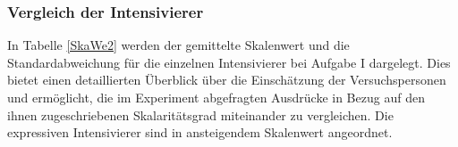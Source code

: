 \subsubsection{Vergleich der Intensivierer} \label{abs:I-Vergleich339}


In Tabelle \ref{SkaWe2} werden der gemittelte Skalenwert und die Standardabweichung für die einzelnen Intensivierer bei Aufgabe I dargelegt. Dies bietet einen detaillierten Überblick über die Einschätzung der Versuchspersonen und ermöglicht, die im Experiment abgefragten Ausdrücke in Bezug auf den ihnen zugeschriebenen Skalaritätsgrad miteinander zu vergleichen. Die expressiven Intensivierer sind in ansteigendem Skalenwert angeordnet.







